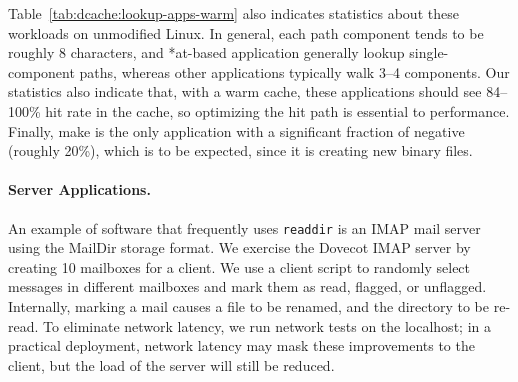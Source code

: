 Table~\ref{tab:dcache:lookup-apps-warm} also indicates statistics about these workloads
on unmodified Linux.  
In general, each path component tends to be roughly 8 characters, 
and *at-based application generally lookup single-component paths, 
whereas other applications typically walk 3--4 components.  
Our statistics also indicate that, with a warm cache, these applications 
should see 84--100\% hit rate in the cache, so optimizing the hit path is essential to performance.
Finally, make is the only application with a significant fraction of 
negative \dentries{} (roughly 20\%),
which is to be expected, since it is creating new binary files.


\paragraph{Server Applications.}
An example of software that frequently uses {\tt readdir} is an
IMAP mail server using the MailDir storage format.
We exercise the Dovecot IMAP server by creating 10 mailboxes for a client.
We use a client script to randomly select messages in different mailboxes and mark them as read, flagged, or unflagged.
Internally, marking a mail causes a file to be renamed, and the directory to be re-read.
To eliminate network latency, we run network tests on the localhost; 
in a practical deployment, network latency may mask these improvements to the client, but the load of the server will still be reduced.



